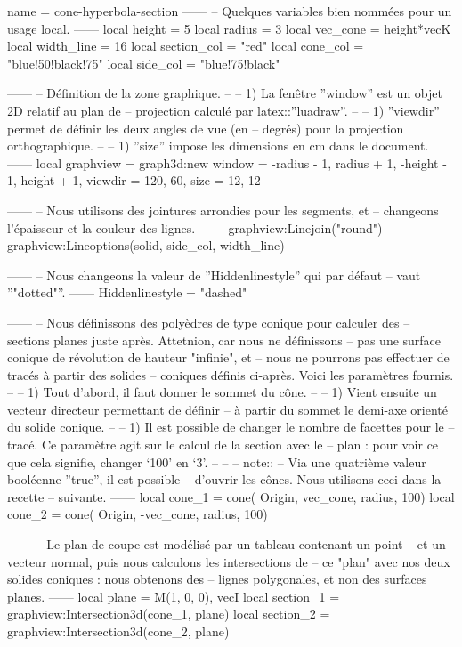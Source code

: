 \documentclass[border = 3pt]{standalone}
\begin{document}
\begin{luadraw}{name = cone-hyperbola-section}
------
-- Quelques variables bien nommées pour un usage local.
------
    local height      =  5
    local radius      =  3
    local vec_cone    = height*vecK
    local width_line  =  16
    local section_col = "red"
    local cone_col    = "blue!50!black!75"
    local side_col    = "blue!75!black"

------
-- Définition de la zone graphique.
--
--     1) La fenêtre ''window'' est un objet 2D relatif au plan de
--     projection calculé par latex::''luadraw''.
--
--     1) ''viewdir'' permet de définir les deux angles de vue (en
--     degrés) pour la projection orthographique.
--
--     1) ''size'' impose les dimensions en cm dans le document.
------
    local graphview = graph3d:new{
        window  = {-radius - 1, radius + 1, -height - 1, height + 1},
        viewdir = {120, 60},
        size    = {12, 12}
    }

------
-- Nous utilisons des jointures arrondies pour les segments, et
-- changeons l'épaisseur et la couleur des lignes.
------
    graphview:Linejoin("round")
    graphview:Lineoptions(solid, side_col, width_line)

------
-- Nous changeons la valeur de ''Hiddenlinestyle'' qui par défaut
-- vaut ''"dotted"''.
------
    Hiddenlinestyle = "dashed"

------
-- Nous définissons des polyèdres de type conique pour calculer des
-- sections planes juste après. Attetnion, car nous ne définissons
-- pas une surface conique de révolution de hauteur "infinie", et
-- nous ne pourrons pas effectuer de tracés à partir des solides
-- coniques définis ci-après. Voici les paramètres fournis.
--
--     1) Tout d'abord, il faut donner le sommet du cône.
--
--     1) Vient ensuite un vecteur directeur permettant de définir
--     à partir du sommet le demi-axe orienté du solide conique.
--
--     1) Il est possible de changer le nombre de facettes pour le
--     tracé. Ce paramètre agit sur le calcul de la section avec le
--     plan : pour voir ce que cela signifie, changer `100' en `3'.
--
--
-- note::
--     Via une quatrième valeur booléenne ''true'', il est possible
--     d'ouvrir les cônes. Nous utilisons ceci dans la recette
--     suivante.
------
    local cone_1 = cone(
        Origin, vec_cone, radius,
        100)
    local cone_2 = cone(
        Origin,  -vec_cone, radius,
        100)

------
-- Le plan de coupe est modélisé par un tableau contenant un point
-- et un vecteur normal, puis nous calculons les intersections de
-- ce "plan" avec nos deux solides coniques : nous obtenons des
-- lignes polygonales, et non des surfaces planes.
------
    local plane     = {M(1, 0, 0), vecI}
    local section_1 = graphview:Intersection3d(cone_1, plane)
    local section_2 = graphview:Intersection3d(cone_2, plane)


\end{luadraw}
\end{document}
